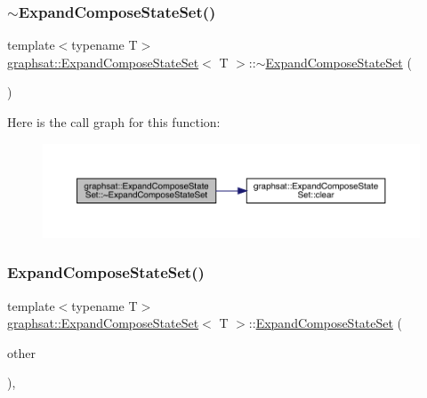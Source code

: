 \subsubsection{\texorpdfstring{$\sim$ExpandComposeStateSet()}{~ExpandComposeStateSet()}}
{\footnotesize\ttfamily template$<$typename T$>$ \\
\mbox{\hyperlink{classgraphsat_1_1_expand_compose_state_set}{graphsat\+::\+Expand\+Compose\+State\+Set}}$<$ T $>$\+::$\sim$\mbox{\hyperlink{classgraphsat_1_1_expand_compose_state_set}{Expand\+Compose\+State\+Set}} (\begin{DoxyParamCaption}{ }\end{DoxyParamCaption})\hspace{0.3cm}{\ttfamily [inline]}}

Here is the call graph for this function\+:\nopagebreak
\begin{figure}[H]
\begin{center}
\leavevmode
\includegraphics[width=350pt]{classgraphsat_1_1_expand_compose_state_set_a393b8b91725f39cbad5e1b3e0102f85a_cgraph}
\end{center}
\end{figure}
\mbox{\label{classgraphsat_1_1_expand_compose_state_set_a1aa9eef8b8e33938b367af8e20b305e1}} 
\subsubsection{\texorpdfstring{ExpandComposeStateSet()}{ExpandComposeStateSet()}\hspace{0.1cm}{\footnotesize\ttfamily [2/2]}}
{\footnotesize\ttfamily template$<$typename T$>$ \\
\mbox{\hyperlink{classgraphsat_1_1_expand_compose_state_set}{graphsat\+::\+Expand\+Compose\+State\+Set}}$<$ T $>$\+::\mbox{\hyperlink{classgraphsat_1_1_expand_compose_state_set}{Expand\+Compose\+State\+Set}} (\begin{DoxyParamCaption}\item[{const \mbox{\hyperlink{classgraphsat_1_1_expand_compose_state_set}{Expand\+Compose\+State\+Set}}$<$ T $>$ \&}]{other }\end{DoxyParamCaption})\hspace{0.3cm}{\ttfamily [inline]}, {\ttfamily [private]}}



